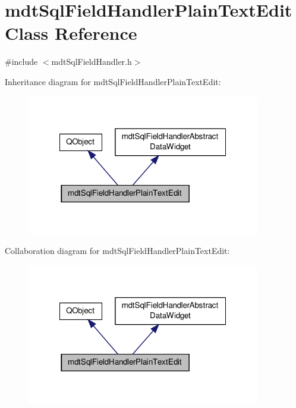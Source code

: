 \hypertarget{classmdt_sql_field_handler_plain_text_edit}{\section{mdt\-Sql\-Field\-Handler\-Plain\-Text\-Edit Class Reference}
\label{classmdt_sql_field_handler_plain_text_edit}
}


{\ttfamily \#include $<$mdt\-Sql\-Field\-Handler.\-h$>$}



Inheritance diagram for mdt\-Sql\-Field\-Handler\-Plain\-Text\-Edit\-:
\nopagebreak
\begin{figure}[H]
\begin{center}
\leavevmode
\includegraphics[width=288pt]{classmdt_sql_field_handler_plain_text_edit__inherit__graph}
\end{center}
\end{figure}


Collaboration diagram for mdt\-Sql\-Field\-Handler\-Plain\-Text\-Edit\-:
\nopagebreak
\begin{figure}[H]
\begin{center}
\leavevmode
\includegraphics[width=288pt]{classmdt_sql_field_handler_plain_text_edit__coll__graph}
\end{center}
\end{figure}

